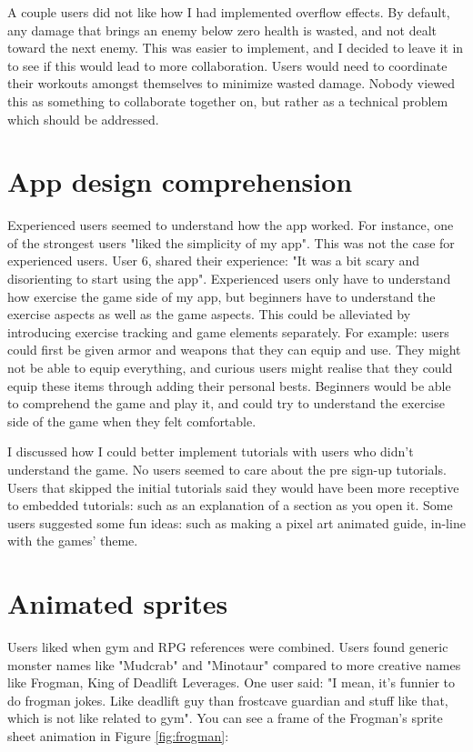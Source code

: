 \documentclass{l4proj}
\begin{document}
A couple users did not like how I had implemented overflow effects. By default, any damage that brings an enemy below zero health is wasted, and not dealt toward the next enemy. This was easier to implement, and I decided to leave it in to see if this would lead to more collaboration. Users would need to coordinate their workouts amongst themselves to minimize wasted damage. Nobody viewed this as something to collaborate together on, but rather as a technical problem which should be addressed.

\section{App design comprehension}
Experienced users seemed to understand how the app worked. For instance, one of the strongest users "liked the simplicity of my app". This was not the case for experienced users. User 6, shared their experience: "It was a bit scary and disorienting to start using the app". Experienced users only have to understand how exercise the game side of my app, but beginners have to understand the exercise aspects as well as the game aspects. This could be alleviated by introducing exercise tracking and game elements separately. For example: users could first be given armor and weapons that they can equip and use. They might not be able to equip everything, and curious users might realise that they could equip these items through adding their personal bests. Beginners would be able to comprehend the game and play it, and could try to understand the exercise side of the game when they felt comfortable.

I discussed how I could better implement tutorials with users who didn't understand the game. No users seemed to care about the pre sign-up tutorials. Users that skipped the initial tutorials said they would have been more receptive to embedded tutorials: such as an explanation of a section as you open it. Some users suggested some fun ideas: such as making a pixel art animated guide, in-line with the games' theme.

\section{Animated sprites}
Users liked when gym and RPG references were combined. Users found generic monster names like "Mudcrab" and "Minotaur" compared to more creative names like Frogman, King of Deadlift Leverages. One user said: "I mean, it's funnier to do frogman jokes. Like deadlift guy than frostcave guardian and stuff like that, which is not like related to gym". You can see a frame of the Frogman's sprite sheet animation in Figure \ref{fig:frogman}:
\end{document}
